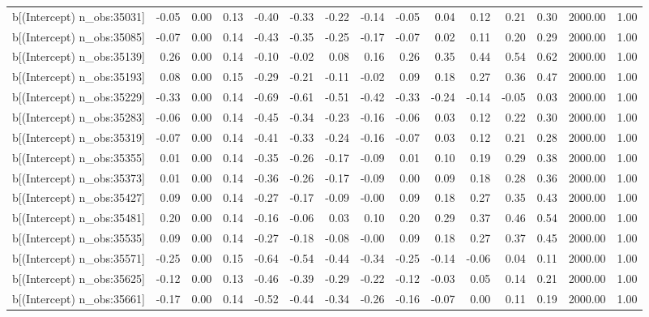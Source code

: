\begin{table}[ht]
\begin{tabular}{rrrrrrrrrrrrrrr}
  b[(Intercept) n\_obs:35031] & -0.05 & 0.00 & 0.13 & -0.40 & -0.33 & -0.22 & -0.14 & -0.05 & 0.04 & 0.12 & 0.21 & 0.30 & 2000.00 & 1.00 \\ 
  b[(Intercept) n\_obs:35085] & -0.07 & 0.00 & 0.14 & -0.43 & -0.35 & -0.25 & -0.17 & -0.07 & 0.02 & 0.11 & 0.20 & 0.29 & 2000.00 & 1.00 \\ 
  b[(Intercept) n\_obs:35139] & 0.26 & 0.00 & 0.14 & -0.10 & -0.02 & 0.08 & 0.16 & 0.26 & 0.35 & 0.44 & 0.54 & 0.62 & 2000.00 & 1.00 \\ 
  b[(Intercept) n\_obs:35193] & 0.08 & 0.00 & 0.15 & -0.29 & -0.21 & -0.11 & -0.02 & 0.09 & 0.18 & 0.27 & 0.36 & 0.47 & 2000.00 & 1.00 \\ 
  b[(Intercept) n\_obs:35229] & -0.33 & 0.00 & 0.14 & -0.69 & -0.61 & -0.51 & -0.42 & -0.33 & -0.24 & -0.14 & -0.05 & 0.03 & 2000.00 & 1.00 \\ 
  b[(Intercept) n\_obs:35283] & -0.06 & 0.00 & 0.14 & -0.45 & -0.34 & -0.23 & -0.16 & -0.06 & 0.03 & 0.12 & 0.22 & 0.30 & 2000.00 & 1.00 \\ 
  b[(Intercept) n\_obs:35319] & -0.07 & 0.00 & 0.14 & -0.41 & -0.33 & -0.24 & -0.16 & -0.07 & 0.03 & 0.12 & 0.21 & 0.28 & 2000.00 & 1.00 \\ 
  b[(Intercept) n\_obs:35355] & 0.01 & 0.00 & 0.14 & -0.35 & -0.26 & -0.17 & -0.09 & 0.01 & 0.10 & 0.19 & 0.29 & 0.38 & 2000.00 & 1.00 \\ 
  b[(Intercept) n\_obs:35373] & 0.01 & 0.00 & 0.14 & -0.36 & -0.26 & -0.17 & -0.09 & 0.00 & 0.09 & 0.18 & 0.28 & 0.36 & 2000.00 & 1.00 \\ 
  b[(Intercept) n\_obs:35427] & 0.09 & 0.00 & 0.14 & -0.27 & -0.17 & -0.09 & -0.00 & 0.09 & 0.18 & 0.27 & 0.35 & 0.43 & 2000.00 & 1.00 \\ 
  b[(Intercept) n\_obs:35481] & 0.20 & 0.00 & 0.14 & -0.16 & -0.06 & 0.03 & 0.10 & 0.20 & 0.29 & 0.37 & 0.46 & 0.54 & 2000.00 & 1.00 \\ 
  b[(Intercept) n\_obs:35535] & 0.09 & 0.00 & 0.14 & -0.27 & -0.18 & -0.08 & -0.00 & 0.09 & 0.18 & 0.27 & 0.37 & 0.45 & 2000.00 & 1.00 \\ 
  b[(Intercept) n\_obs:35571] & -0.25 & 0.00 & 0.15 & -0.64 & -0.54 & -0.44 & -0.34 & -0.25 & -0.14 & -0.06 & 0.04 & 0.11 & 2000.00 & 1.00 \\ 
  b[(Intercept) n\_obs:35625] & -0.12 & 0.00 & 0.13 & -0.46 & -0.39 & -0.29 & -0.22 & -0.12 & -0.03 & 0.05 & 0.14 & 0.21 & 2000.00 & 1.00 \\ 
  b[(Intercept) n\_obs:35661] & -0.17 & 0.00 & 0.14 & -0.52 & -0.44 & -0.34 & -0.26 & -0.16 & -0.07 & 0.00 & 0.11 & 0.19 & 2000.00 & 1.00 \\ 

\end{tabular}
\end{table}

